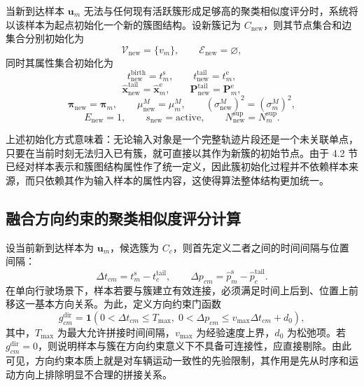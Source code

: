 \documentclass{xdupgthesis}
\begin{document}
当新到达样本 $\mathbf{u}_m$ 无法与任何现有活跃簇形成足够高的聚类相似度评分时，系统将以该样本为起点初始化一个新的簇图结构。设新簇记为 $C_{\mathrm{new}}$，则其节点集合和边集合分别初始化为
\begin{equation}
	\mathcal{V}_{\mathrm{new}}=\{v_m\}, \qquad
	\mathcal{E}_{\mathrm{new}}=\varnothing,
\end{equation}
同时其属性集合初始化为
\begin{equation}
	t_{\mathrm{new}}^{\mathrm{birth}} = t_m^{\mathrm{s}}, \qquad
	t_{\mathrm{new}}^{\mathrm{tail}} = t_m^{\mathrm{e}},
\end{equation}
\begin{equation}
	\hat{\mathbf{x}}_{\mathrm{new}}^{\mathrm{tail}} = \hat{\mathbf{x}}_m^{\mathrm{e}}, \qquad
	\mathbf{P}_{\mathrm{new}}^{\mathrm{tail}} = \mathbf{P}_m^{\mathrm{e}},
\end{equation}
\begin{equation}
	\boldsymbol{\pi}_{\mathrm{new}} = \boldsymbol{\pi}_m, \qquad
	\mu_{\mathrm{new}}^{M} = \mu_m^{M}, \qquad
	(\sigma_{\mathrm{new}}^{M})^{2} = (\sigma_m^{M})^{2},
\end{equation}
\begin{equation}
	E_{\mathrm{new}} = 1, \qquad
	s_{\mathrm{new}} = \mathrm{active}, \qquad
	N_{\mathrm{new}}^{\mathrm{sup}} = N_m^{\mathrm{sup}}.
\end{equation}

上述初始化方式意味着：无论输入对象是一个完整轨迹片段还是一个未关联单点，只要在当前时刻无法归入已有簇，就可直接以其作为新簇的初始节点。由于 4.2 节已经对样本表示和簇图结构属性作了统一定义，因此簇初始化过程并不依赖样本来源，而只依赖其作为输入样本的属性内容，这使得算法整体结构更加统一。

\subsection{融合方向约束的聚类相似度评分计算}

设当前新到达样本为 $\mathbf{u}_m$，候选簇为 $C_c$，则首先定义二者之间的时间间隔与位置间隔：
\begin{equation}
	\Delta t_{cm}=t_m^{\mathrm{s}}-t_c^{\mathrm{tail}}, \qquad
	\Delta p_{cm}=\hat p_m^{\mathrm{s}}-\hat p_c^{\mathrm{tail}}.
\end{equation}
在单向行驶场景下，样本若要与簇建立有效连接，必须满足时间上后到、位置上前移这一基本方向关系。为此，定义方向约束门函数
\begin{equation}
	g_{cm}^{\mathrm{dir}}=
	\mathbf{1}\!\left(
	0<\Delta t_{cm}\le T_{\max},
	\;
	0<\Delta p_{cm}\le v_{\max}\Delta t_{cm}+d_0
	\right),
\end{equation}
其中，$T_{\max}$ 为最大允许拼接时间间隔，$v_{\max}$ 为经验速度上界，$d_0$ 为松弛项。若 $g_{cm}^{\mathrm{dir}}=0$，则说明样本与簇在方向约束意义下不具备可连接性，应直接剔除。由此可见，方向约束本质上就是对车辆运动一致性的先验限制，其作用是先从时序和运动方向上排除明显不合理的拼接关系。
\end{document}
